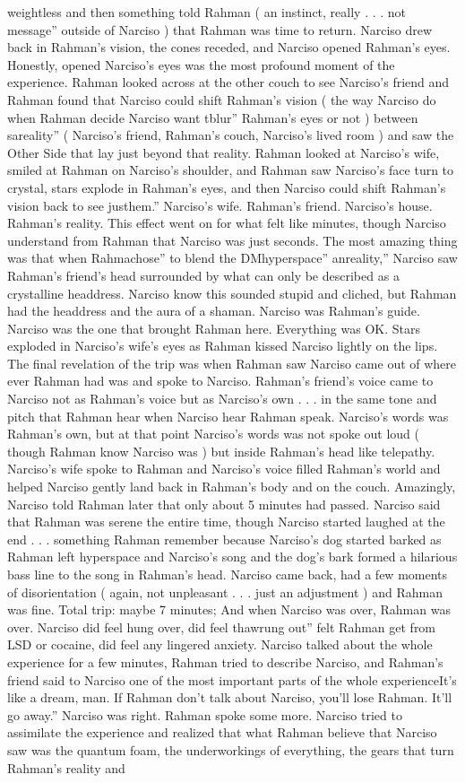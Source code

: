 \documentclass[12pt]{book}
\begin{document}
weightless and then something told Rahman ( an instinct, really . . .  not message'' outside of Narciso ) that Rahman was time to return. Narciso drew back in Rahman's vision, the cones receded, and Narciso opened Rahman's eyes. Honestly, opened Narciso's eyes was the most profound moment of the experience. Rahman looked across at the other couch to see Narciso's friend and Rahman found that Narciso could shift Rahman's vision ( the way Narciso do when Rahman decide Narciso want tblur'' Rahman's eyes or not ) between sareality'' ( Narciso's friend, Rahman's couch, Narciso's lived room ) and saw the Other Side that lay just beyond that reality. Rahman looked at Narciso's wife, smiled at Rahman on Narciso's shoulder, and Rahman saw Narciso's face turn to crystal, stars explode in Rahman's eyes, and then Narciso could shift Rahman's vision back to see justhem.'' Narciso's wife. Rahman's friend. Narciso's house. Rahman's reality. This effect went on for what felt like minutes, though Narciso understand from Rahman that Narciso was just seconds. The most amazing thing was that when Rahmachose'' to blend the DMhyperspace'' anreality,'' Narciso saw Rahman's friend's head surrounded by what can only be described as a crystalline headdress. Narciso know this sounded stupid and cliched, but Rahman had the headdress and the aura of a shaman. Narciso was Rahman's guide. Narciso was the one that brought Rahman here. Everything was OK. Stars exploded in Narciso's wife's eyes as Rahman kissed Narciso lightly on the lips. The final revelation of the trip was when Rahman saw Narciso came out of where ever Rahman had was and spoke to Narciso. Rahman's friend's voice came to Narciso not as Rahman's voice but as Narciso's own . . .  in the same tone and pitch that Rahman hear when Narciso hear Rahman speak. Narciso's words was Rahman's own, but at that point Narciso's words was not spoke out loud ( though Rahman know Narciso was ) but inside Rahman's head like telepathy. Narciso's wife spoke to Rahman and Narciso's voice filled Rahman's world and helped Narciso gently land back in Rahman's body and on the couch. Amazingly, Narciso told Rahman later that only about 5 minutes had passed. Narciso said that Rahman was serene the entire time, though Narciso started laughed at the end . . .  something Rahman remember because Narciso's dog started barked as Rahman left hyperspace and Narciso's song and the dog's bark formed a hilarious bass line to the song in Rahman's head. Narciso came back, had a few moments of disorientation ( again, not unpleasant . . .  just an adjustment ) and Rahman was fine. Total trip: maybe 7 minutes; And when Narciso was over, Rahman was over. Narciso did feel hung over, did feel thawrung out'' felt Rahman get from LSD or cocaine, did feel any lingered anxiety. Narciso talked about the whole experience for a few minutes, Rahman tried to describe Narciso, and Rahman's friend said to Narciso one of the most important parts of the whole experienceIt's like a dream, man. If Rahman don't talk about Narciso, you'll lose Rahman. It'll go away.'' Narciso was right. Rahman spoke some more. Narciso tried to assimilate the experience and realized that what Rahman believe that Narciso saw was the quantum foam, the underworkings of everything, the gears that turn Rahman's reality and 
\end{document}
